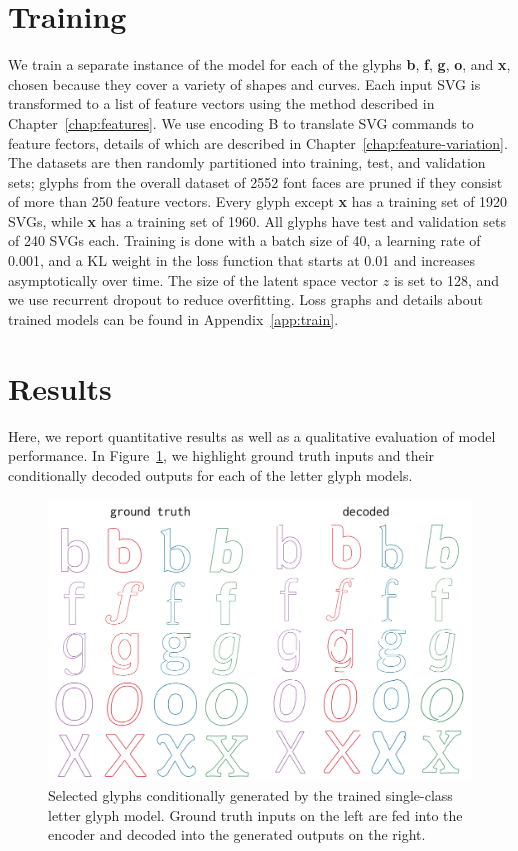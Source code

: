\section{Training}
We train a separate instance of the model for each of the glyphs \textbf{b}, \textbf{f}, \textbf{g}, \textbf{o}, and \textbf{x}, chosen because they cover a variety of shapes and curves.
Each input SVG is transformed to a list of feature vectors using the method described in Chapter~\ref{chap:features}.
We use encoding B to translate SVG commands to feature fectors, details of which are described in Chapter~\ref{chap:feature-variation}.
The datasets are then randomly partitioned into training, test, and validation sets; glyphs from the overall dataset of 2552 font faces are pruned if they consist of more than 250 feature vectors.
Every glyph except \textbf{x} has a training set of 1920 SVGs, while \textbf{x} has a training set of 1960.
All glyphs have test and validation sets of 240 SVGs each.
Training is done with a batch size of 40, a learning rate of 0.001, and a KL weight in the loss function that starts at 0.01 and increases asymptotically over time.
The size of the latent space vector $z$ is set to 128, and we use recurrent dropout to reduce overfitting.
Loss graphs and details about trained models can be found in Appendix~\ref{app:train}.

\section{Results}
Here, we report quantitative results as well as a qualitative evaluation of model performance.
In Figure~\ref{fig:font_gen}, we highlight ground truth inputs and their conditionally decoded outputs for each of the letter glyph models.
\begin{figure}[h]
    \centering
	\includegraphics[width=\textwidth]{figures/font_gen}
    \caption[Visual results of training single-class model on letter glyph datasets]
    {Selected glyphs conditionally generated by the trained single-class letter glyph model.
    Ground truth inputs on the left are fed into the encoder and decoded into the generated outputs on the right.\label{fig:font_gen}}
\end{figure}

